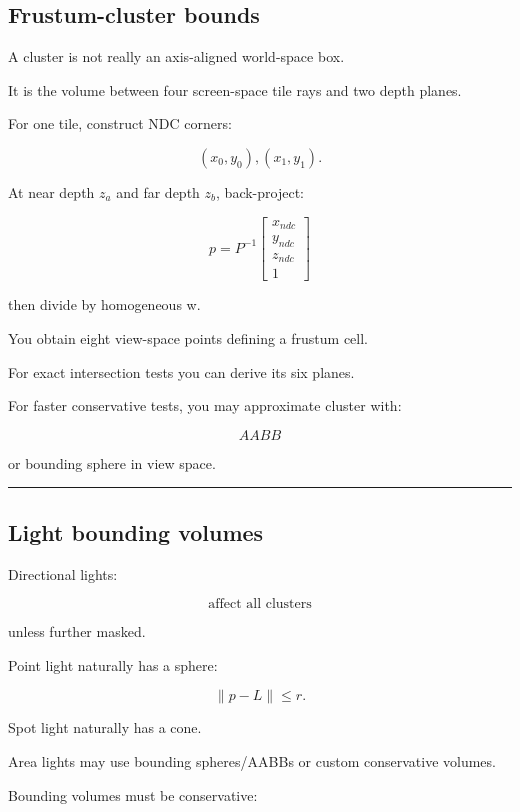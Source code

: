 \subsection{Frustum-cluster bounds}\label{04-visual-computing-ii-ch040-frustum-cluster-bounds}

A cluster is not really an axis-aligned world-space box.

It is the volume between four screen-space tile rays and two depth planes.

For one tile, construct NDC corners:

\[
(x_0,y_0),(x_1,y_1).
\]

At near depth \(z_a\) and far depth \(z_b\), back-project:

\[
p=
P^{-1}
\begin{bmatrix}
x_{ndc}\\
y_{ndc}\\
z_{ndc}\\
1
\end{bmatrix}
\]

then divide by homogeneous w.

You obtain eight view-space points defining a frustum cell.

For exact intersection tests you can derive its six planes.

For faster conservative tests, you may approximate cluster with:

\[
AABB
\]

or bounding sphere in view space.

\begin{center}\rule{0.5\linewidth}{0.5pt}\end{center}

\subsection{Light bounding volumes}\label{04-visual-computing-ii-ch040-light-bounding-volumes}

Directional lights:

\[
\boxed{\text{affect all clusters}}
\]

unless further masked.

Point light naturally has a sphere:

\[
\|p-L\|\le r.
\]

Spot light naturally has a cone.

Area lights may use bounding spheres/AABBs or custom conservative volumes.

Bounding volumes must be conservative:


